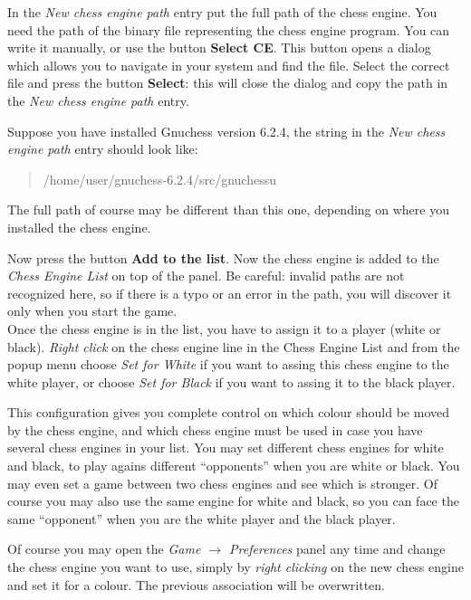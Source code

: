 \documentclass[a4paper]{article}
\begin{document}
In the \textit{New chess engine path} entry put the full path of the chess engine. You need the path of the binary file representing the chess engine program.
You can write it manually, or use the button \textbf{Select CE}. This button opens a dialog which allows you to navigate in your system and find the file.
Select the correct file and press the button \textbf{Select}: this will close the dialog and copy the path in the \textit{New chess engine path} entry.

Suppose you have installed Gnuchess version 6.2.4, the string in the \textit{New chess engine path} entry should look like:

\begin{quote}
/home/user/gnuchess-6.2.4/src/gnuchessu
\end{quote}

The full path of course may be different than this one, depending on where you installed the chess engine.

Now press the button \textbf{Add to the list}. Now the chess engine is added to the \textit{Chess Engine List} on top of the panel.
Be careful: invalid paths are not recognized here, so if there is a typo or an error in the path, you will discover it only when you start the game.\\

Once the chess engine is in the list, you have to assign it to a player (white or black). \textit{Right click} on the chess engine line in the Chess Engine List
and from the popup menu choose \textit{Set for White} if you want to assing this chess engine to the white player, or choose \textit{Set for Black}
if you want to assing it to the black player.

This configuration gives you complete control on which colour should be moved by the chess engine, and which chess engine must be used in case you have several chess engines
in your list. You may set different chess engines for white and black, to play agains different ``opponents'' when you are white or black. You may even set a game
between two chess engines and see which is stronger. Of course you may also use the same engine for white and black, so you can face the same ``opponent'' when
you are the white player and the black player.

Of course you may open the \textit{Game $\rightarrow$ Preferences} panel any time and change the chess engine you want to use, simply by \textit{right clicking}
on the new chess engine and set it for a colour. The previous association will be overwritten.
\end{document}
